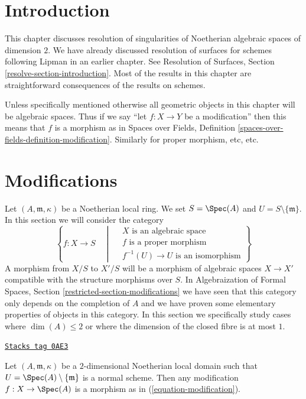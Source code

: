 \section{Introduction}
\label{spaces-resolve-section-introduction}
This chapter discusses resolution of singularities of
Noetherian algebraic spaces of dimension $2$.
We have already discussed resolution of surfaces
for schemes following Lipman \cite{Lipman} in an earlier
chapter. See
Resolution of Surfaces, Section \ref{resolve-section-introduction}.
Most of the results in this chapter are straightforward
consequences of the results on schemes.

\medskip\noindent
Unless specifically mentioned otherwise all geometric objects
in this chapter will be algebraic spaces. Thus if we say
``let $f : X \to Y$ be a modification'' then this means that
$f$ is a morphism as in Spaces over Fields, Definition
\ref{spaces-over-fields-definition-modification}.
Similarly for proper morphism, etc, etc.

\section{Modifications}
\label{spaces-resolve-section-modifications}
Let $(A, \mathfrak m, \kappa)$ be a Noetherian local ring. We set
$S = \Spec(A)$ and $U = S \setminus \{\mathfrak m\}$. In this section
we will consider the category
\begin{equation}
\label{equation-modification}
\left\{
f : X \longrightarrow S
\quad \middle| \quad
\begin{matrix}
X\text{ is an algebraic space}\\
f\text{ is a proper morphism}\\
f^{-1}(U) \to U\text{ is an isomorphism}
\end{matrix}
\right\}
\end{equation}
A morphism from $X/S$ to $X'/S$ will be a morphism of algebraic spaces
$X \to X'$ compatible with the structure morphisms over $S$. In
Algebraization of Formal Spaces, Section \ref{restricted-section-modifications}
we have seen that this category only depends on the completion of $A$
and we have proven some elementary properties of objects in this category.
In this section we specifically study cases where
$\dim(A) \leq 2$ or where the dimension of the closed fibre is at most $1$.

\begin{lemma}[Modification]
\label{spaces-resolve-lemma-modification}
\href{https://stacks.math.columbia.edu/tag/0AE3}{\texttt{Stacks tag 0AE3}}

Let $(A, \mathfrak m, \kappa)$ be a $2$-dimensional Noetherian
local domain such that $U = \Spec(A) \setminus \{\mathfrak m\}$
is a normal scheme. Then any modification $f : X \to \Spec(A)$
is a morphism as in (\ref{equation-modification}).
\end{lemma}

